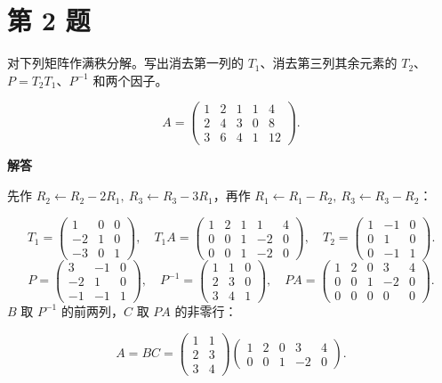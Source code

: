 \documentclass[UTF8,10pt,letterpaper,fontset=fandol]{ctexart}
\begin{document}
\section{第 2 题}
对下列矩阵作满秩分解。写出消去第一列的 $T_1$、消去第三列其余元素的 $T_2$、$P=T_2T_1$、$P^{-1}$ 和两个因子。\par
\[
 A=\begin{pmatrix}1&2&1&1&4\\2&4&3&0&8\\3&6&4&1&12\end{pmatrix}.
\]
\par{}\textbf{解答}\par
先作 $R_2\gets R_2-2R_1,\ R_3\gets R_3-3R_1$，再作 $R_1\gets R_1-R_2,\ R_3\gets R_3-R_2$：\par
\[
T_1=\begin{pmatrix}1&0&0\\-2&1&0\\-3&0&1\end{pmatrix},\quad
T_1A=\begin{pmatrix}1&2&1&1&4\\0&0&1&-2&0\\0&0&1&-2&0\end{pmatrix},\quad
T_2=\begin{pmatrix}1&-1&0\\0&1&0\\0&-1&1\end{pmatrix}.
\]
\[
 P=\begin{pmatrix}3&-1&0\\-2&1&0\\-1&-1&1\end{pmatrix},\quad
 P^{-1}=\begin{pmatrix}1&1&0\\2&3&0\\3&4&1\end{pmatrix},\quad
 PA=\begin{pmatrix}1&2&0&3&4\\0&0&1&-2&0\\0&0&0&0&0\end{pmatrix}.
\]
$B$ 取 $P^{-1}$ 的前两列，$C$ 取 $PA$ 的非零行：\par
\[
 \boxed{A=BC=\begin{pmatrix}1&1\\2&3\\3&4\end{pmatrix}
 \begin{pmatrix}1&2&0&3&4\\0&0&1&-2&0\end{pmatrix}} .
\]
\newpage
\end{document}
